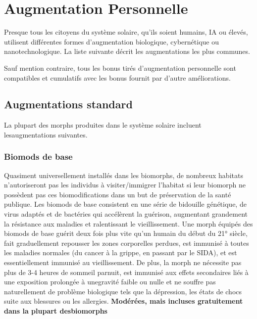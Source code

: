 \section{Augmentation Personnelle} \label{sec:personal-augmentation} 

Presque tous les citoyens du système solaire, qu'ils soient humains, IA ou élevés, utilisent différentes formes d'augmentation biologique, cybernétique ou nanotechnologique. La liste suivante décrit les augmentations les plus communes.  

Sauf mention contraire, tous les bonus tirés d'augmentation personnelle sont compatibles et cumulatifs avec les bonus fournit par d'autre améliorations. 



\subsection{Augmentations standard} \label{sec:std-augmentations} 

La plupart des morphs produites dans le système solaire incluent lesaugmentations suivantes. 

\subsubsection{Biomods de base} 

Quasiment universellement  installés dans les biomorphs, de nombreux habitats n'autoriseront pas les individus à visiter/immigrer l'habitat si leur biomorph ne possèdent pas ces biomodifications dans un but de préservation de la santé publique. Les biomods de base consistent en une série de bidouille génétique, de virus adaptés et de bactéries qui accélèrent la guérison, augmentant grandement la résistance aux maladies et ralentissant le vieillissement. Une morph équipés des biomods de base guérit deux fois plus vite qu'un humain du début du 21° siècle, fait graduellement repousser les zones corporelles perdues, est immunisé à toutes les maladies normales (du cancer à la grippe, en passant par le SIDA), et est essentiellement immunisé au vieillissement. De plus, la morph ne nécessite pas plus de 3-4 heures de sommeil parnuit, est immunisé aux effets secondaires liés à une exposition prolongée à unegravité faible ou nulle et ne souffre pas naturellement de problème biologique tels que la dépression, les états de chocs suite aux blessures ou les allergies. \textbf{{Modérées, mais incluses gratuitement dans la plupart desbiomorphs}} 


